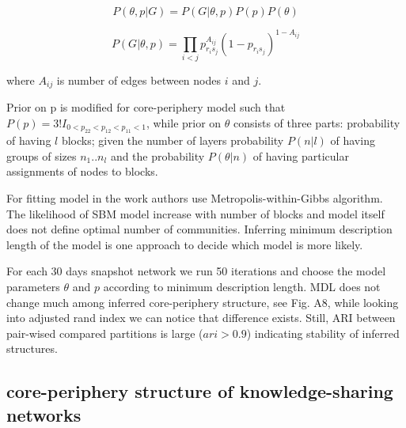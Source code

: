 \begin{equation}
P(\theta, p| G) = P(G | \theta , p) P(p) P(\theta) 
\end{equation}

\begin{equation}
P(G | \theta , p) = \prod_{i<j} p_{r_is_j}^{A_{ij}}(1-p_{r_is_j})^{1-A_{ij}}  
\end{equation}

where $A_{ij}$ is number of edges between nodes $i$ and $j$. 

Prior on p is modified for core-periphery model such that $P(p) = 3!I_{0<p_{22}<p_{12}<p_{11}<1}$, while prior on $\theta $ consists of three parts: probability of having $l$ blocks; given the number of layers probability $P(n|l)$ of having groups of sizes ${n_1..n_l}$ and the probability $P(\theta|n)$ of having particular assignments of nodes to blocks. 

For fitting model in the work \cite{gallagher2020clarified} authors use Metropolis-within-Gibbs algorithm.
The likelihood of SBM model increase with number of blocks and model itself does not define optimal number of communities. Inferring minimum description length
of the model is one approach to decide which model is more likely.  

For each 30 days snapshot network we run 50 iterations and choose the model parameters $\theta$ and $p$ according to minimum description length. MDL does not change much among inferred core-periphery structure, see Fig. A8, while looking into adjusted rand index we can notice that difference exists. Still, ARI between pair-wised compared partitions is large ($ari >0.9$) indicating stability of inferred structures.

\subsection{core-periphery structure of knowledge-sharing networks}

